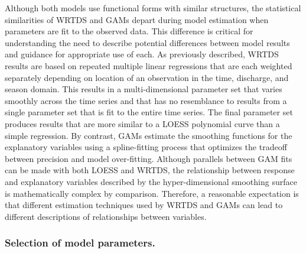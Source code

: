 \documentclass[letterpaper,12pt,oneside]{article}\usepackage[]{graphicx}\usepackage[]{color}
\begin{document}
Although both models use functional forms with similar structures, the statistical similarities of \ac{WRTDS} and \acp{GAM} depart during model estimation when parameters are fit to the observed data.  This difference is critical for understanding the need to describe potential differences between model results and guidance for appropriate use of each. As previously described, \ac{WRTDS} results are based on repeated multiple linear regressions that are each weighted separately depending on location of an observation in the time, discharge, and season domain.  This results in a multi-dimensional parameter set that varies smoothly across the time series and that has no resemblance to results from a single parameter set that is fit to the entire time series.  The final parameter set produces results that are more similar to a \ac{LOESS} polynomial curve \citep[i.e.,][]{Cleveland79} than a simple regression. By contrast, \acp{GAM} estimate the smoothing functions for the explanatory variables using a spline-fitting process that optimizes the tradeoff between precision and model over-fitting.  Although parallels between \ac{GAM} fits can be made with both \ac{LOESS} and \ac{WRTDS}, the relationship between response and explanatory variables described by the hyper-dimensional smoothing surface is mathematically complex by comparison.  Therefore, a reasonable expectation is that different estimation techniques used by \ac{WRTDS} and \acp{GAM} can lead to different descriptions of relationships between variables.

\subsubsection*{\hspace*{0.25in}Selection of model parameters.}
\end{document}
